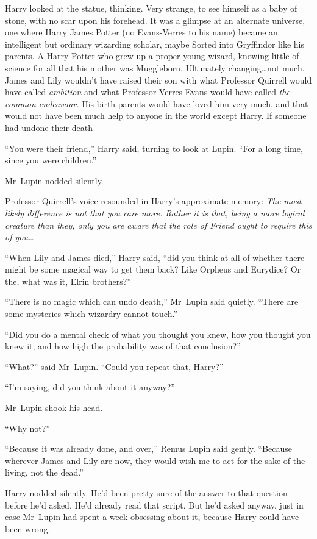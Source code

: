 Harry looked at the statue, thinking. Very strange, to see himself as a baby of stone, with no scar upon his forehead. It was a glimpse at an alternate universe, one where Harry James Potter (no Evans-Verres to his name) became an intelligent but ordinary wizarding scholar, maybe Sorted into Gryffindor like his parents. A Harry Potter who grew up a proper young wizard, knowing little of science for all that his mother was Muggleborn. Ultimately changing…not much. James and Lily wouldn’t have raised their son with what Professor Quirrell would have called \emph{ambition} and what Professor Verres-Evans would have called \emph{the common endeavour.} His birth parents would have loved him very much, and that would not have been much help to anyone in the world except Harry. If someone had undone their death—

“You were their friend,” Harry said, turning to look at Lupin. “For a long time, since you were children.”

Mr~Lupin nodded silently.

Professor Quirrell’s voice resounded in Harry’s approximate memory: \emph{The most likely difference is not that you care more. Rather it is that, being a more logical creature than they, only you are aware that the role of Friend ought to require this of you…}

“When Lily and James died,” Harry said, “did you think at all of whether there might be some magical way to get them back? Like Orpheus and Eurydice? Or the, what was it, Elrin brothers?”

“There is no magic which can undo death,” Mr~Lupin said quietly. “There are some mysteries which wizardry cannot touch.”

“Did you do a mental check of what you thought you knew, how you thought you knew it, and how high the probability was of that conclusion?”

“What?” said Mr~Lupin. “Could you repeat that, Harry?”

“I’m saying, did you think about it anyway?”

Mr~Lupin shook his head.

“Why not?”

“Because it was already done, and over,” Remus Lupin said gently. “Because wherever James and Lily are now, they would wish me to act for the sake of the living, not the dead.”

Harry nodded silently. He’d been pretty sure of the answer to that question before he’d asked. He’d already read that script. But he’d asked anyway, just in case Mr~Lupin had spent a week obsessing about it, because Harry could have been wrong.

